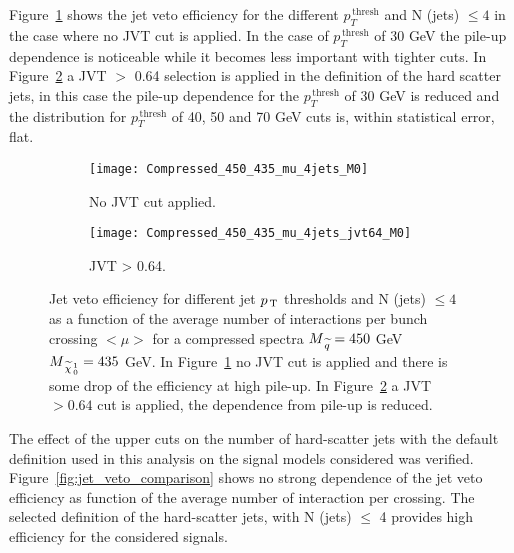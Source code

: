 Figure~\ref{fig:comp_4jets_nojvt} shows the jet veto efficiency for the
different $p_T^{\mathrm{\, thresh}}$ and N (jets) $\leq 4$ in the case where no
JVT cut is applied. In the case of $p_T^{\mathrm{\, thresh}}$ of 30 GeV the
pile-up dependence is noticeable while it becomes less important with tighter
cuts. In Figure~\ref{fig:comp_4jets_jvt64} a JVT $>$ 0.64 selection is applied
in the definition of the hard scatter jets, in this case the pile-up dependence
for the $p_T^{\mathrm{\, thresh}}$ of 30 GeV is reduced and the distribution for
$p_T^{\mathrm{\, thresh}}$ of 40, 50 and 70 GeV cuts is, within statistical
error, flat.
\begin{figure}[!h]
  \centering
  \begin{subfigure}[t]{.48\linewidth}
    \texttt{[image: Compressed\_450\_435\_mu\_4jets\_M0]}
    \caption{No JVT cut applied.}
    \label{fig:comp_4jets_nojvt}
  \end{subfigure}
  \begin{subfigure}[t]{.48\linewidth}
    \texttt{[image: Compressed\_450\_435\_mu\_4jets\_jvt64\_M0]}
    \caption{JVT > 0.64.}
    \label{fig:comp_4jets_jvt64}
  \end{subfigure}
  \caption{Jet veto efficiency for different jet $p_\mathrm{\, T}$ thresholds and N (jets)
    $\leq 4$ as a function of the average number of interactions per bunch
    crossing $<\mu>$ for a compressed spectra $M_{\, \widetilde{q}} = 450$ GeV
    $M_{\, \widetilde{\chi}_{\, 0}^{\, 1}} = 435$ GeV. In Figure~\ref{fig:comp_4jets_nojvt} no JVT cut is
    applied and there is some drop of the efficiency at high pile-up. In
    Figure~\ref{fig:comp_4jets_jvt64} a JVT $> 0.64$ cut is applied, the
    dependence from pile-up is reduced.}
  \label{fig:comp_eff}
\end{figure}
The effect of the upper cuts on the number of hard-scatter jets with the default
definition used in this analysis on the signal models considered was
verified. Figure~\ref{fig:jet_veto_comparison} shows no strong dependence of the
jet veto efficiency as function of the average number of interaction per
crossing. The selected definition of the hard-scatter jets, with N (jets) $\leq$
4 provides high efficiency for the considered signals.

